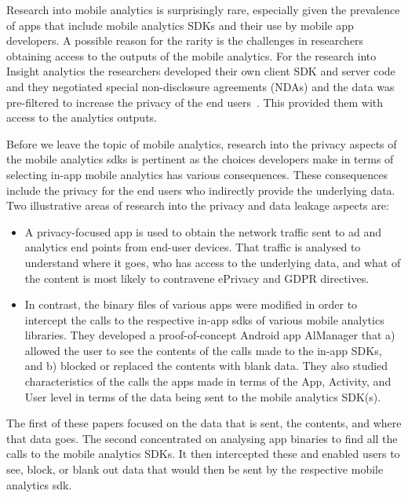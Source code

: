 Research into mobile analytics is surprisingly rare, especially given the prevalence of apps that include mobile analytics SDKs and their use by mobile app developers. A possible reason for the rarity is the challenges in researchers obtaining access to the outputs of the mobile analytics. For the research into Insight analytics the researchers developed their own client SDK and server code and they negotiated special non-disclosure agreements (NDAs) and the data was pre-filtered to increase the privacy of the end users~. This provided them with access to the analytics outputs.

Before we leave the topic of mobile analytics, research into the privacy aspects of the mobile analytics \Glspl{sdk} is pertinent as the choices developers make in terms of selecting in-app mobile analytics has various consequences. These consequences include the privacy for the end users who indirectly provide the underlying data. Two illustrative areas of research into the privacy and data leakage aspects are:

\begin{itemize}
        \item A privacy-focused app is used to obtain the network traffic sent to ad and analytics end points from end-user devices. That traffic is analysed to understand where it goes, who has access to the underlying data, and what of the content is most likely to contravene ePrivacy and GDPR directives\cite{razaghpanah2018_apps_trackers_privacy_and_regulators_a_global_study_of_the_mobile_tracking_ecosystem}.
        \item In contrast, the binary files of various apps were modified in order to intercept the calls to the respective in-app \Glspl{sdk} of various mobile analytics libraries. They developed a proof-of-concept Android app AlManager that a) allowed the user to see the contents of the calls made to the in-app SDKs, and b) blocked or replaced the contents with blank data. They also studied characteristics of the calls the apps made in terms of the App, Activity, and User level in terms of the data being sent to the mobile analytics SDK(s)\cite{liu2020_privacy_risk_analysis_and_mitigation_of_analytics_libraries_in_the_android_ecosystem}.
\end{itemize}

The first of these papers focused on the data that is sent, the contents, and where that data goes. The second concentrated on analysing app binaries to find all the calls to the mobile analytics SDKs. It then intercepted these and enabled users to see, block, or blank out data that would then be sent by the respective mobile analytics \Gls{sdk}.

